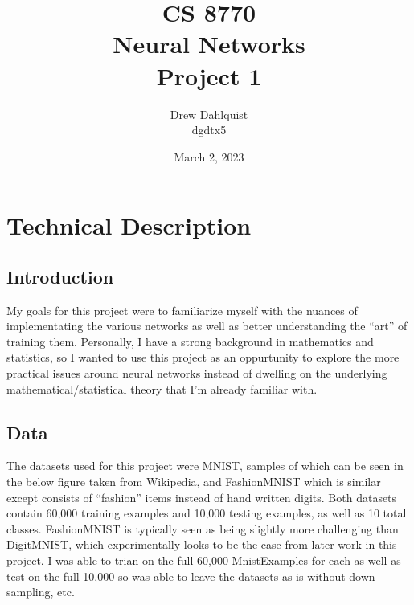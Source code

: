 \documentclass[12pt, twoside]{report}
\begin{document}
\title{CS 8770 \\ Neural Networks \\ Project 1}
\author{Drew Dahlquist \\ dgdtx5}
\date{March 2, 2023}
\maketitle

\tableofcontents



\chapter{Technical Description}

\section{Introduction}
My goals for this project were to familiarize myself with the nuances of implementating the
various networks as well as better understanding the ``art'' of training them.
Personally, I have a strong background in mathematics and statistics, so I wanted to use this
project as an oppurtunity to explore the more practical issues around neural networks instead 
of dwelling on the underlying mathematical/statistical theory that I'm already familiar with.

\section{Data}

The datasets used for this project were MNIST, samples of which can be seen in the
below figure taken from Wikipedia, and FashionMNIST which is similar except consists of
``fashion'' items instead of hand written digits.
Both datasets contain 60,000 training examples and 10,000 testing examples, as well as 
10 total classes.
FashionMNIST is typically seen as being slightly more challenging than DigitMNIST, which
experimentally looks to be the case from later work in this project.
I was able to trian on the full 60,000 MnistExamples for each as well as test on the full
10,000 so was able to leave the datasets as is without down-sampling, etc.
\end{document}
